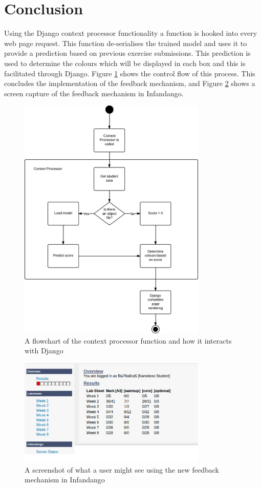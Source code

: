 \section{Conclusion}
Using the Django context processor functionality a function is hooked into every web page request. This function de-serialises the trained model and uses it to provide a prediction based on previous exercise submissions. This prediction is used to determine the colours which will be displayed in each box and this is facilitated through Django. Figure \ref{fig:contextprocessor} shows the control flow of this process. This concludes the implementation of the feedback mechanism, and Figure \ref{fig:finalfeedback} shows a screen capture of the feedback mechanism in Infandango.

\begin{figure}[h!]
\centering
\includegraphics[width=0.8\textwidth]{images/contextprocessor.png}
\caption{A flowchart of the context processor function and how it interacts with Django}
\label{fig:contextprocessor}
\end{figure}

\begin{figure}[h!]
\centering
\includegraphics[width=0.8\textwidth]{images/finalfeedback.png}
\caption{A screenshot of what a user might see using the new feedback mechanism in Infandango}
\label{fig:finalfeedback}
\end{figure}
